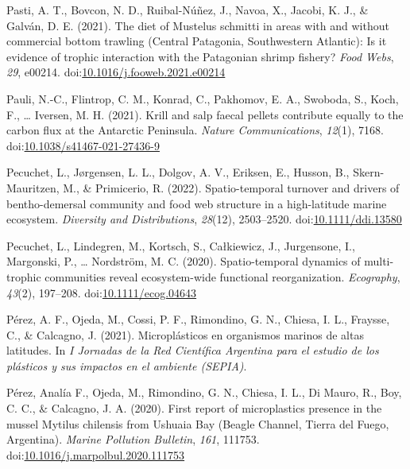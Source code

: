 \documentclass[
]{article}
\newlength{\cslhangindent}
\newlength{\cslentryspacingunit} %
\newenvironment{CSLReferences}[2] %
 {%
  \setlength{\parindent}{0pt}
  \ifodd #1
  \let\oldpar\par
  \def\par{\hangindent=\cslhangindent\oldpar}
  \fi
  \setlength{\parskip}{#2\cslentryspacingunit}
 }%
 {}
\begin{document}
\begin{CSLReferences}{1}{0}
\leavevmode{}%
Pasti, A. T., Bovcon, N. D., Ruibal-Núñez, J., Navoa, X., Jacobi, K. J.,
\& Galván, D. E. (2021). The diet of {Mustelus} schmitti in areas with
and without commercial bottom trawling ({Central Patagonia},
{Southwestern Atlantic}): {Is} it evidence of trophic interaction with
the {Patagonian} shrimp fishery? \emph{Food Webs}, \emph{29}, e00214.
doi:\href{https://doi.org/10.1016/j.fooweb.2021.e00214}{10.1016/j.fooweb.2021.e00214}

\leavevmode{}%
Pauli, N.-C., Flintrop, C. M., Konrad, C., Pakhomov, E. A., Swoboda, S.,
Koch, F., \ldots{} Iversen, M. H. (2021). Krill and salp faecal pellets
contribute equally to the carbon flux at the {Antarctic Peninsula}.
\emph{Nature Communications}, \emph{12}(1), 7168.
doi:\href{https://doi.org/10.1038/s41467-021-27436-9}{10.1038/s41467-021-27436-9}

\leavevmode{}%
Pecuchet, L., Jørgensen, L. L., Dolgov, A. V., Eriksen, E., Husson, B.,
Skern-Mauritzen, M., \& Primicerio, R. (2022). Spatio-temporal turnover
and drivers of bentho-demersal community and food web structure in a
high-latitude marine ecosystem. \emph{Diversity and Distributions},
\emph{28}(12), 2503--2520.
doi:\href{https://doi.org/10.1111/ddi.13580}{10.1111/ddi.13580}

\leavevmode{}%
Pecuchet, L., Lindegren, M., Kortsch, S., Całkiewicz, J., Jurgensone,
I., Margonski, P., \ldots{} Nordström, M. C. (2020). Spatio-temporal
dynamics of multi-trophic communities reveal ecosystem-wide functional
reorganization. \emph{Ecography}, \emph{43}(2), 197--208.
doi:\href{https://doi.org/10.1111/ecog.04643}{10.1111/ecog.04643}

\leavevmode{}%
Pérez, A. F., Ojeda, M., Cossi, P. F., Rimondino, G. N., Chiesa, I. L.,
Fraysse, C., \& Calcagno, J. (2021). {Microplásticos en organismos
marinos de altas latitudes}. In \emph{{I Jornadas de la Red Científica
Argentina para el estudio de los plásticos y sus impactos en el ambiente
(SEPIA)}}.

\leavevmode{}%
Pérez, Analía F., Ojeda, M., Rimondino, G. N., Chiesa, I. L., Di Mauro,
R., Boy, C. C., \& Calcagno, J. A. (2020). First report of microplastics
presence in the mussel {Mytilus} chilensis from {Ushuaia Bay} ({Beagle
Channel}, {Tierra} del {Fuego}, {Argentina}). \emph{Marine Pollution
Bulletin}, \emph{161}, 111753.
doi:\href{https://doi.org/10.1016/j.marpolbul.2020.111753}{10.1016/j.marpolbul.2020.111753}


\end{CSLReferences}
\end{document}
